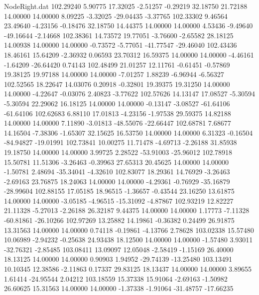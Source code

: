\begin{filecontents}{NodeRight.dat}
 102.29240    5.90775   17.32025    -2.51257   -0.29219   32.18750   21.72188   14.00000   14.00000    8.09225   -3.32025  -29.04435   -3.37765
 102.33302    9.46564   23.49640    -4.23156   -0.18476   32.18750   14.44375   14.00000   14.00000    4.53436   -9.49640  -49.16644   -2.14668
 102.38361   14.73572   19.77051    -3.76600   -2.65582   28.18125   14.00938   14.00000   14.00000   -0.73572   -5.77051  -41.77547  -29.46040
 102.43436   18.46161   15.64209    -2.36932    0.06593   23.70312   16.59375   14.00000   14.00000   -4.46161   -1.64209  -26.64420    0.74143
 102.48499   21.01257   12.11761    -0.61451   -0.57869   19.38125   19.97188   14.00000   14.00000   -7.01257    1.88239   -6.96944   -6.56327
 102.52565   18.22647   14.03076     0.20918   -0.32801   19.39375   19.31250   14.00000   14.00000   -4.22647   -0.03076    2.40823   -3.77622
 102.57626   14.13147   17.08527    -5.30594   -5.30594   22.29062   16.18125   14.00000   14.00000   -0.13147   -3.08527  -61.64106  -61.64106
 102.62683    6.88110   17.01813    -4.23156   -1.97538   29.59375   14.82188   14.00000   14.00000    7.11890   -3.01813  -48.55076  -22.66447
 102.68781    7.68677   14.16504    -7.38306   -1.65307   32.15625   16.53750   14.00000   14.00000    6.31323   -0.16504  -84.94827  -19.01991
 102.73841   10.00275   11.71478    -4.69713   -2.26188   31.85938   19.18750   14.00000   14.00000    3.99725    2.28522  -53.91003  -25.96012
 102.78918   15.50781   11.51306    -3.26463   -0.39963   27.65313   20.45625   14.00000   14.00000   -1.50781    2.48694  -35.34041   -4.32610
 102.83077   18.29361   14.76929    -3.26463   -2.69163   23.76875   18.24063   14.00000   14.00000   -4.29361   -0.76929  -35.16879  -28.99604
 102.88155   17.05185   18.96515    -1.36657   -0.43544   23.16250   13.61875   14.00000   14.00000   -3.05185   -4.96515  -15.31092   -4.87867
 102.93219   12.82227   21.11328    -5.27013   -2.26188   26.32187    9.44375   14.00000   14.00000    1.17773   -7.11328  -60.81861  -26.10266
 102.97269   13.25882   14.19861    -0.36382    0.24499   26.91875   13.31563   14.00000   14.00000    0.74118   -0.19861   -4.13766    2.78628
 103.02338   15.57480   10.06989    -2.94232   -0.25638   24.93438   18.12500   14.00000   14.00000   -1.57480    3.93011  -32.76321   -2.85485
 103.08411   13.09097   12.05048    -2.58419   -1.15169   26.40000   18.13125   14.00000   14.00000    0.90903    1.94952  -29.74139  -13.25480
 103.13491   10.10345   12.38586    -2.11863    0.17337   29.83125   18.13437   14.00000   14.00000    3.89655    1.61414  -24.95544    2.04212
 103.18559   15.37338   15.91064    -2.69163   -1.50982   26.60625   15.31563   14.00000   14.00000   -1.37338   -1.91064  -31.48757  -17.66235

\end{filecontents}
